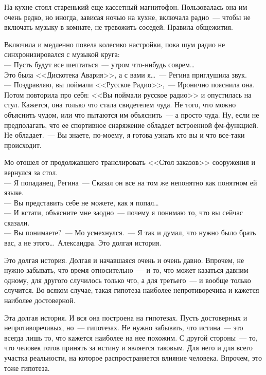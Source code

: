На кухне стоял старенький еще кассетный магнитофон. Пользовалась она им очень 
редко, но иногда, зависая ночью на кухне, включала радио~--- чтобы не включать 
музыку в комнате, не тревожить соседей. Правила общежития.

Включила и медленно повела колесико настройки, пока шум радио не 
синхронизировался с музыкой круга:\\
--- Пусть будут все шептаться~--- утром что-нибудь соврем\ldots\\
Это была <<Дискотека Авария>>, а с вами я\ldots~--- Регина приглушила звук.\\
--- Поздравляю, вы поймали <<Русское Радио>>,~--- Иронично пояснила она. Потом 
повторила про себя: <<Вы поймали русское радио>> и опустилась на стул. Кажется, 
она только что стала свидетелем чуда. Не того, что можно объяснить чудом, или 
что пытаются им объяснить~--- а просто чуда. Ну, если не предполагать, что ее 
спортивное снаряжение обладает встроенной фм-функцией. Не обладает.~--- Вы 
знаете, 
по-моему, я готова узнать кто вы и что все-таки происходит.

Мо отошел от продолжавшего транслировать <<Стол заказов>> сооружения и вернулся 
за 
стол.\\
--- Я попаданец, Регина~--- Сказал он все на том же непонятно как понятном ей 
языке.\\
--- Вы представить себе не можете, как я попал\ldots\\
--- И кстати, объясните мне заодно~--- почему я понимаю то, что вы сейчас 
сказали.\\
--- Вы понимаете?~--- Мо усмехнулся.~--- Я так и думал, что нужно было брать 
вас, а не 
этого\ldots\ Александра. Это долгая история.




Это долгая история. Долгая и начавшаяся очень и очень давно. Впрочем, не нужно 
забывать, что время относительно~--- и то, что может казаться давним одному, 
для 
другого случилось только что, а для третьего~--- и вообще только случится. Во 
всяком случае, такая гипотеза наиболее непротиворечива и кажется наиболее 
достоверной.

Эта долгая история. И вся она построена на гипотезах. Пусть достоверных и 
непротиворечивых, но~--- гипотезах. Не нужно забывать, что истина~--- это 
всегда 
лишь то, что кажется наиболее на нее похожим. С другой стороны~--- то, что 
человек 
готов принять за истину и является таковым. Для него и для всего участка 
реальности, на которое распространяется влияние человека. Впрочем, это тоже 
гипотеза.

